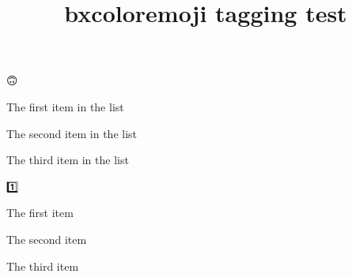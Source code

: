 \documentclass{article}
\title{bxcoloremoji tagging test}
\begin{document}

\begin{coloremojilist}{🙃}
\item The first item in the list
\item The second item in the list
\item The third item in the list
\end{coloremojilist}

\begin{coloremojiautolist}{1️⃣}
\item The first item
\item The second item
\item The third item
\end{coloremojiautolist}


\end{document}

